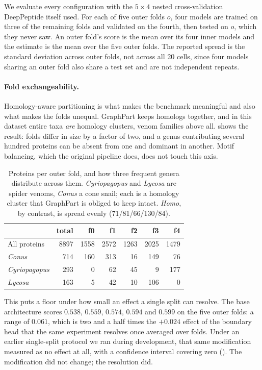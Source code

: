 \documentclass{article}
\begin{document}
We evaluate every configuration with the $5\times4$ nested cross-validation DeepPeptide itself used. For each of five outer folds $o$, four models are trained on three of the remaining folds and validated on the fourth, then tested on $o$, which they never saw. An outer fold's score is the mean over its four inner models and the estimate is the mean over the five outer folds. The reported spread is the standard deviation across outer folds, not across all 20 cells, since four models sharing an outer fold also share a test set and are not independent repeats.

\paragraph{Fold exchangeability.} Homology-aware partitioning is what makes the benchmark meaningful and also what makes the folds unequal. GraphPart keeps homologs together, and in this dataset entire taxa \emph{are} homology clusters, venom families above all.  shows the result: folds differ in size by a factor of two, and a genus contributing several hundred proteins can be absent from one and dominant in another. Motif balancing, which the original pipeline does, does not touch this axis.

\begin{table}[h]
\centering
\caption{Proteins per outer fold, and how three frequent genera distribute across them. \emph{Cyriopagopus} and \emph{Lycosa} are spider venoms, \emph{Conus} a cone snail; each is a homology cluster that GraphPart is obliged to keep intact. \textit{Homo}, by contrast, is spread evenly (71/81/66/130/84).}
\label{tab:genus}
\small
\begin{tabular}{lrrrrrr}
\toprule
 & \textbf{total} & \textbf{f0} & \textbf{f1} & \textbf{f2} & \textbf{f3} & \textbf{f4} \\
\midrule
All proteins & 8897 & 1558 & 2572 & 1263 & 2025 & 1479 \\
\midrule
\textit{Conus} & 714 & 160 & 313 & 16 & 149 & 76 \\
\textit{Cyriopagopus} & 293 & 0 & 62 & 45 & 9 & 177 \\
\textit{Lycosa} & 163 & 5 & 42 & 10 & 106 & 0 \\
\bottomrule
\end{tabular}
\end{table}

This puts a floor under how small an effect a single split can resolve. The base architecture scores $0.538$, $0.559$, $0.574$, $0.594$ and $0.599$ on the five outer folds: a range of $0.061$, which is two and a half times the $+0.024$ effect of the boundary head that the same experiment resolves once averaged over folds. Under an earlier single-split protocol we ran during development, that same modification measured as no effect at all, with a confidence interval covering zero (). The modification did not change; the resolution did.
\end{document}
